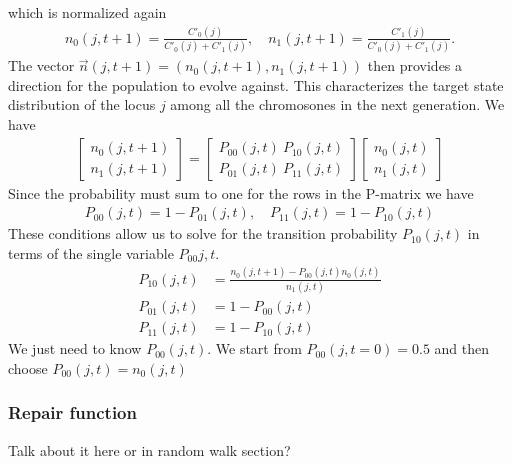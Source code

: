 which is normalized again
\begin{align*}
  n_0(j, t+1) = \frac{C'_0(j)}{C'_0(j) + C'_1(j)}, \quad n_1(j, t+1) = \frac{C'_1(j)}{C'_0(j) + C'_1(j)}.
\end{align*}
The vector $\vec{n}(j,t+1)=(n_0(j, t+1), n_1(j, t+1))$ then provides a direction for the population to evolve against. This characterizes the target state distribution of the locus $j$ among all the chromosones in the next generation. We have
\begin{align*}
  \begin{bmatrix}
    n_0(j, t+1) \\
    n_1(j, t+1)
  \end{bmatrix}
  = 
  \begin{bmatrix}
    P_{00}(j,t) \ P_{10}(j,t) \\
    P_{01}(j,t) \ P_{11}(j,t)
  \end{bmatrix}
  \begin{bmatrix}
    n_0(j, t) \\
    n_1(j, t)
  \end{bmatrix}
\end{align*}
Since the probability must sum to one for the rows in the P-matrix we have 
\begin{align*}
  P_{00}(j, t) = 1 - P_{01}(j, t), \quad P_{11}(j, t) = 1 - P_{10}(j, t)
\end{align*}
These conditions allow us to solve for the transition probability $P_{10}(j,t)$ in terms of the single variable $P_{00}{j,t}$.
\begin{align*}
  P_{10}(j,t) &= \frac{n_0(j, t+1) - P_{00}(j,t)n_0(j, t)}{n_1(j,t)} \\
  P_{01}(j,t) &= 1 - P_{00}(j,t) \\
  P_{11}(j,t) &= 1 - P_{10}(j,t)
\end{align*}
We just need to know $P_{00}(j,t)$. We start from $P_{00}(j, t = 0) = 0.5$ and then choose $P_{00}(j,t) = n_0(j,t)$




\subsubsection{Repair function}
Talk about it here or in random walk section?